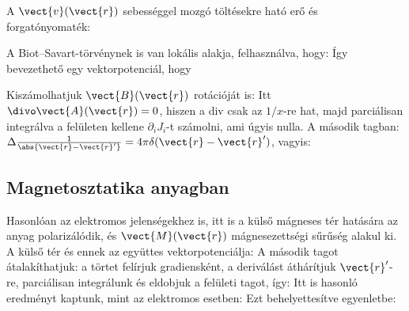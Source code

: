    A $\vect{v}(\vect{r})$ sebességgel mozgó töltésekre ható erő és forgatónyomaték:
   
   A Biot--Savart-törvénynek is van lokális alakja, felhasználva, hogy:
   Így bevezethető egy vektorpotenciál, hogy 
   
   Kiszámolhatjuk $\vect{B}(\vect{r})$ rotációját is:
   Itt $\divo\vect{A}(\vect{r})=0$, hiszen a div csak az $1/x$-re hat, majd parciálisan integrálva a felületen kellene $\partial_i J_i$-t számolni, ami úgyis nulla.
   A második tagban:$\Delta\frac{1}{\abs{\vect{r}-\vect{r}'}} =4\pi\delta(\vect{r}-\vect{r}')$, vagyis:
   
  \subsection{Magnetosztatika anyagban}\label{ss1:magnetosztatika}
   
   Hasonlóan az elektromos jelenségekhez is, itt is a külső mágneses tér hatására az anyag polarizálódik, és $\vect{M}(\vect{r})$ mágnesezettségi sűrűség alakul ki.
   A külső tér és ennek az együttes vektorpotenciálja:
   A második tagot átalakíthatjuk: a törtet felírjuk gradiensként, a deriválást áthárítjuk $\vect{r}'$-re, parciálisan integrálunk és eldobjuk a felületi tagot, így:
   Itt is hasonló eredményt kaptunk, mint az elektromos esetben: 
   Ezt behelyettesítve  egyenletbe:
   
